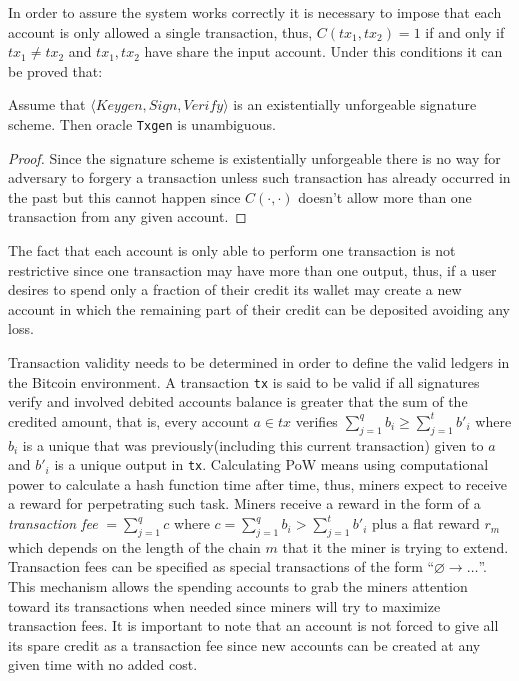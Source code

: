 \documentclass[..]{subfiles}
\begin{document}
In order to assure the system works correctly it is necessary to impose that each account is only allowed a single transaction, thus, $C(tx_1, tx_2) = 1$ if and only if $tx_1 \neq tx_2$ and $tx_1, tx_2$ have share the input account.
Under this conditions it can be proved that:

\begin{proposition}
	Assume that $\langle Keygen, Sign, Verify \rangle$ is an existentially unforgeable signature scheme. Then oracle \texttt{Txgen} is unambiguous.
\end{proposition}
\begin{proof}
	Since the signature scheme is existentially unforgeable there is no way for adversary to forgery a transaction unless such transaction has already occurred in the past but this cannot happen since $C(\cdot, \cdot)$ doesn't allow more than one transaction from any given account.
\end{proof}

The fact that each account is only able to perform one transaction is not restrictive since one transaction may have more than one output, thus, if a user desires to spend only a fraction of their credit its wallet may create a new account in which the remaining part of their credit can be deposited avoiding any loss.

Transaction validity needs to be determined in order to define the valid ledgers in the Bitcoin environment. A transaction \texttt{tx} is said to be valid if all signatures verify and involved debited accounts balance is greater that the sum of the credited amount, that is, every account $a \in tx$ verifies $\sum_{j=1}^{q}{b_i} \ge \sum_{j=1}^{t}{{b'}_i}$ where $b_i$ is a unique that was previously(including this current transaction) given to $a$ and ${b'}_i$ is a unique output in \texttt{tx}. Calculating PoW means using computational power to calculate a hash function time after time, thus, miners expect to receive a reward for perpetrating such task. Miners receive a reward in the form of a \textit{transaction fee} $= \sum_{j=1}^{q}{c}$ where $c = \sum_{j=1}^{q}{b_i} > \sum_{j=1}^{t}{{b'}_i}$ plus a flat reward $r_m$ which depends on the length of the chain $m$ that it the miner is trying to extend. Transaction fees can be specified as special transactions of the form ``$\varnothing \rightarrow \dots$''. This mechanism allows the spending accounts to grab the miners attention toward its transactions when needed since miners will try to maximize transaction fees. It is important to note that an account is not forced to give all its spare credit as a transaction fee since new accounts can be created at any given time with no added cost.
\end{document}
